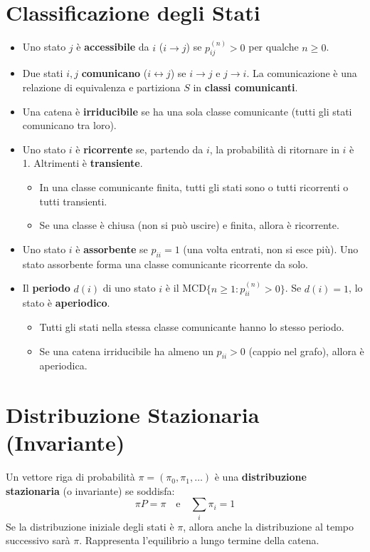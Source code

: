 \section{Classificazione degli Stati}
\begin{itemize}
    \item Uno stato $j$ è \textbf{accessibile} da $i$ ($i \to j$) se $p_{ij}^{(n)} > 0$ per qualche $n \ge 0$.
    \item Due stati $i,j$ \textbf{comunicano} ($i \leftrightarrow j$) se $i \to j$ e $j \to i$. La comunicazione è una relazione di equivalenza e partiziona $S$ in \textbf{classi comunicanti}.
    \item Una catena è \textbf{irriducibile} se ha una sola classe comunicante (tutti gli stati comunicano tra loro).
    \item Uno stato $i$ è \textbf{ricorrente} se, partendo da $i$, la probabilità di ritornare in $i$ è 1. Altrimenti è \textbf{transiente}.
    \begin{itemize}
        \item In una classe comunicante finita, tutti gli stati sono o tutti ricorrenti o tutti transienti.
        \item Se una classe è chiusa (non si può uscire) e finita, allora è ricorrente.
    \end{itemize}
    \item Uno stato $i$ è \textbf{assorbente} se $p_{ii}=1$ (una volta entrati, non si esce più). Uno stato assorbente forma una classe comunicante ricorrente da solo.
    \item Il \textbf{periodo} $d(i)$ di uno stato $i$ è il MCD$\{n \ge 1 : p_{ii}^{(n)} > 0\}$. Se $d(i)=1$, lo stato è \textbf{aperiodico}.
    \begin{itemize}
        \item Tutti gli stati nella stessa classe comunicante hanno lo stesso periodo.
        \item Se una catena irriducibile ha almeno un $p_{ii}>0$ (cappio nel grafo), allora è aperiodica.
    \end{itemize}
\end{itemize}

\section{Distribuzione Stazionaria (Invariante)}
\begin{definition}
Un vettore riga di probabilità $\pi = (\pi_0, \pi_1, \dots)$ è una \textbf{distribuzione stazionaria} (o invariante) se soddisfa:
\[ \pi P = \pi \quad \text{e} \quad \sum_i \pi_i = 1 \]
Se la distribuzione iniziale degli stati è $\pi$, allora anche la distribuzione al tempo successivo sarà $\pi$. Rappresenta l'equilibrio a lungo termine della catena.
\end{definition}

